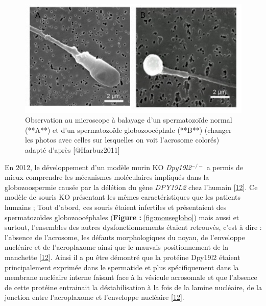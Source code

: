 \documentclass[12pt,twoside]{reedthesis}
\theoremstyle{definition}
\theoremstyle{definition}
\theoremstyle{remark}
\begin{document}
  \begin{figure}
  
  {\centering \includegraphics[scale=0.50]{figure/globo_normal_spz} 
  
  }
  
  \caption[Observation au microscope à balayage d'un spermatozoïde normal (**A**) et d'un spermatozoïde globozoocéphale (**B**) (changer les photos avec celles sur lesquelles on voit l'acrosome colorés)]{Observation au microscope à balayage d'un spermatozoïde normal (**A**) et d'un spermatozoïde globozoocéphale (**B**) (changer les photos avec celles sur lesquelles on voit l'acrosome colorés) adapté d'après [@Harbuz2011]}\label{fig:globospz}
  \end{figure}
  
  En 2012, le développement d'un modèle murin KO \emph{Dpy19l2}\(^{-/-}\)
  a permis de mieux comprendre les mécanismes moléculaires impliqués dans
  la globozoospermie causée par la délétion du gène \emph{DPY19L2} chez
  l'humain {[}\protect\hyperlink{ref-Pierre2012}{12}{]}. Ce modèle de
  souris KO présentant les mêmes caractéristiques que les patients humains
  ; Tout d'abord, ces souris étaient infertiles et présentaient des
  spermatozoïdes globozoocéphales (\textbf{Figure : }\ref{fig:mouseglobo})
  mais aussi et surtout, l'ensembles des autres dysfonctionnements étaient
  retrouvés, c'est à dire : l'absence de l'acrosome, les défauts
  morphologiques du noyau, de l'enveloppe nucléaire et de l'acroplaxome
  ainsi que le mauvais positionnement de la manchette
  {[}\protect\hyperlink{ref-Pierre2012}{12}{]}. Ainsi il a pu être
  démontré que la protéine Dpy19l2 étaient principalement exprimée dans le
  spermatide et plus spécifiquement dans la membrane nucléaire interne
  faisant face à la vésicule acrosomale et que l'absence de cette protéine
  entrainait la déstabilisation à la fois de la lamine nucléaire, de la
  jonction entre l'acroplaxome et l'enveloppe nucléaire
  {[}\protect\hyperlink{ref-Pierre2012}{12}{]}.
  
\end{document}
